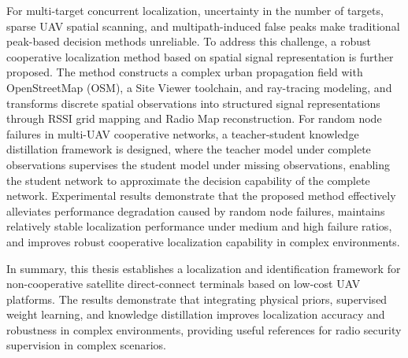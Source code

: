 \begin{enabstract}
For multi-target concurrent localization, uncertainty in the number of targets, sparse UAV spatial scanning, and multipath-induced false peaks make traditional peak-based decision methods unreliable. To address this challenge, a robust cooperative localization method based on spatial signal representation is further proposed. The method constructs a complex urban propagation field with OpenStreetMap (OSM), a Site Viewer toolchain, and ray-tracing modeling, and transforms discrete spatial observations into structured signal representations through RSSI grid mapping and Radio Map reconstruction. For random node failures in multi-UAV cooperative networks, a teacher-student knowledge distillation framework is designed, where the teacher model under complete observations supervises the student model under missing observations, enabling the student network to approximate the decision capability of the complete network. Experimental results demonstrate that the proposed method effectively alleviates performance degradation caused by random node failures, maintains relatively stable localization performance under medium and high failure ratios, and improves robust cooperative localization capability in complex environments.

In summary, this thesis establishes a localization and identification framework for non-cooperative satellite direct-connect terminals based on low-cost UAV platforms. The results demonstrate that integrating physical priors, supervised weight learning, and knowledge distillation improves localization accuracy and robustness in complex environments, providing useful references for radio security supervision in complex scenarios.

\end{enabstract}
\clearpage
\thispagestyle{empty}
\mbox{}
\clearpage
